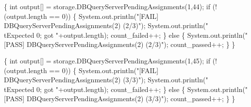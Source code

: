 \documentclass{article}
\def\nwendcode{\endtrivlist \endgroup}
\let\nwdocspar=\par
\begin{document}
\{
  int output[] = storage.DBQueryServerPendingAssignments(1,44);
  if (!(output.length == 0)) \{
    System.out.println("[FAIL] DBQueryServerPendingAssignments(2) (2/3)");
    System.out.println("\\tExpected 0; got "+output.length);
    count_failed++;
  \} else \{
    System.out.println("[PASS] DBQueryServerPendingAssignments(2) (2/3)");
    count_passed++;
  \}
\}
\nwendcode{}\nwdocspar
\nwenddocs{}\endmoddef{}
\{
  int output[] = storage.DBQueryServerPendingAssignments(1,45);
  if (!(output.length == 0)) \{
    System.out.println("[FAIL] DBQueryServerPendingAssignments(2) (3/3)");
    System.out.println("\\tExpected 0; got "+output.length);
    count_failed++;
  \} else \{
    System.out.println("[PASS] DBQueryServerPendingAssignments(2) (3/3)");
    count_passed++;
  \}
\}
\nwendcode{}\nwdocspar
\end{document}
